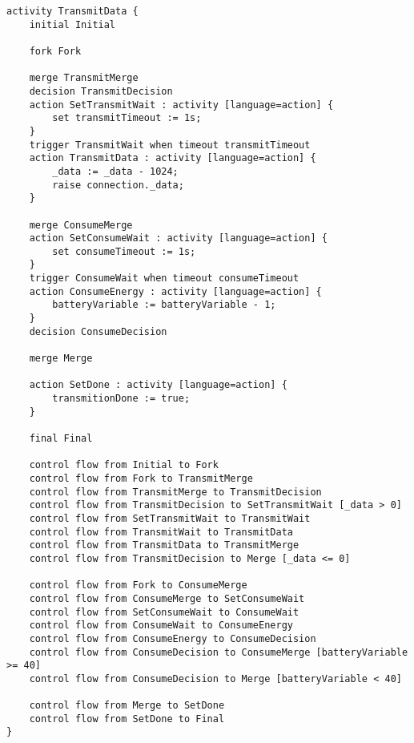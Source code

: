 \begin{lstlisting}[float,language=statechart, caption={}, label={}]
activity TransmitData {				
	initial Initial
	
	fork Fork
	
	merge TransmitMerge
	decision TransmitDecision
	action SetTransmitWait : activity [language=action] {
		set transmitTimeout := 1s;
	}
	trigger TransmitWait when timeout transmitTimeout
	action TransmitData : activity [language=action] {
		_data := _data - 1024;
		raise connection._data;
	}
	
	merge ConsumeMerge
	action SetConsumeWait : activity [language=action] {
		set consumeTimeout := 1s;
	}
	trigger ConsumeWait when timeout consumeTimeout
	action ConsumeEnergy : activity [language=action] {
		batteryVariable := batteryVariable - 1;
	}
	decision ConsumeDecision
	
	merge Merge
	
	action SetDone : activity [language=action] {
		transmitionDone := true;
	}
	
	final Final
	
	control flow from Initial to Fork
	control flow from Fork to TransmitMerge
	control flow from TransmitMerge to TransmitDecision
	control flow from TransmitDecision to SetTransmitWait [_data > 0]
	control flow from SetTransmitWait to TransmitWait
	control flow from TransmitWait to TransmitData
	control flow from TransmitData to TransmitMerge
	control flow from TransmitDecision to Merge [_data <= 0]
	
	control flow from Fork to ConsumeMerge
	control flow from ConsumeMerge to SetConsumeWait
	control flow from SetConsumeWait to ConsumeWait
	control flow from ConsumeWait to ConsumeEnergy
	control flow from ConsumeEnergy to ConsumeDecision
	control flow from ConsumeDecision to ConsumeMerge [batteryVariable >= 40]
	control flow from ConsumeDecision to Merge [batteryVariable < 40]
	
	control flow from Merge to SetDone
	control flow from SetDone to Final
}
\end{lstlisting}


